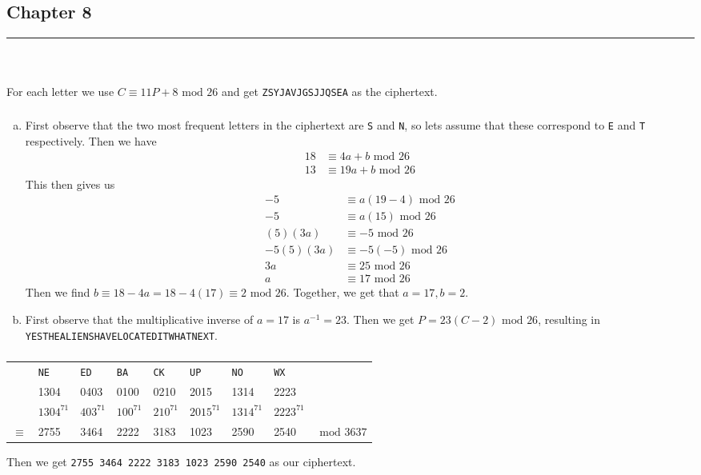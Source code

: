 \documentclass[class=article, crop=false]{standalone}
\begin{document}
\setcounter{subsection}{7}
\subsection{Chapter 8}
\rule{\textwidth}{1pt}\\
\subsubsection{}
For each letter we use $C\equiv 11P + 8\mbox{ mod }26$ and get \verb|ZSYJAVJGSJJQSEA|
  as the ciphertext.
\subsubsection{}
\begin{enumerate}[(a)]
	\item  First observe that the two most frequent letters in the ciphertext are
	\verb|S| and \verb|N|, so lets assume that these correspond to
	\verb|E| and \verb|T| respectively. Then we have
	\begin{align*}
		18 &\equiv 4a+b\mbox{ mod }26 \\
		13 &\equiv 19a+b\mbox{ mod }26
	\end{align*}
	This then gives us
	\begin{align*}
		-5 &\equiv a(19-4)\mbox{ mod }26 \\
		-5 &\equiv a(15)\mbox{ mod }26 \\
		(5)(3a) &\equiv -5\mbox{ mod }26 \\
		-5(5)(3a) &\equiv -5(-5)\mbox{ mod }26 \\
		3a &\equiv 25\mbox{ mod }26 \\
		a &\equiv 17\mbox{ mod }26
	\end{align*}
	Then we find $b\equiv 18-4a=18-4(17)\equiv 2\mbox{ mod }26$. Together,
	we get that $a=17,b=2$.
	\item First observe that the multiplicative inverse of $a=17$ is $a^{-1}=23$.
	Then we get $P=23(C-2)\mbox{ mod }26$, resulting in
	\verb|YESTHEALIENSHAVELOCATEDITWHATNEXT|.
\end{enumerate}
\subsubsection{}
\begin{table}[h]
	\centering
	\begin{tabular}{c l l l l l l l l}
		$ $& \verb|NE|& \verb|ED|& \verb|BA|& \verb|CK|& \verb|UP|& \verb|NO|& \verb|WX|& \\
		$ $& 1304& 0403& 0100& 0210& 2015& 1314& 2223& \\
		$ $& $1304^{71}$& $403^{71}$& $100^{71}$& $210^{71}$& $2015^{71}$& $1314^{71}$& $2223^{71}$& \\
		\hline
		$\equiv$& 2755& 3464& 2222& 3183& 1023& 2590& 2540& $\mbox{ mod }3637$
	\end{tabular}
\end{table}
Then we get \verb|2755 3464 2222 3183 1023 2590 2540| as our ciphertext.
\end{document}
